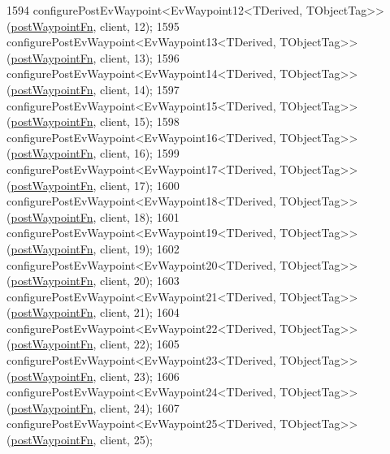 \begin{DoxyCode}
1594     configurePostEvWaypoint<EvWaypoint12<TDerived, TObjectTag>>(\hyperlink{classcl__move__base__z_1_1WaypointEventDispatcher_a964a57fcce5d48ec60243230722d8dd7}{postWaypointFn}, client, 12);
1595     configurePostEvWaypoint<EvWaypoint13<TDerived, TObjectTag>>(\hyperlink{classcl__move__base__z_1_1WaypointEventDispatcher_a964a57fcce5d48ec60243230722d8dd7}{postWaypointFn}, client, 13);
1596     configurePostEvWaypoint<EvWaypoint14<TDerived, TObjectTag>>(\hyperlink{classcl__move__base__z_1_1WaypointEventDispatcher_a964a57fcce5d48ec60243230722d8dd7}{postWaypointFn}, client, 14);
1597     configurePostEvWaypoint<EvWaypoint15<TDerived, TObjectTag>>(\hyperlink{classcl__move__base__z_1_1WaypointEventDispatcher_a964a57fcce5d48ec60243230722d8dd7}{postWaypointFn}, client, 15);
1598     configurePostEvWaypoint<EvWaypoint16<TDerived, TObjectTag>>(\hyperlink{classcl__move__base__z_1_1WaypointEventDispatcher_a964a57fcce5d48ec60243230722d8dd7}{postWaypointFn}, client, 16);
1599     configurePostEvWaypoint<EvWaypoint17<TDerived, TObjectTag>>(\hyperlink{classcl__move__base__z_1_1WaypointEventDispatcher_a964a57fcce5d48ec60243230722d8dd7}{postWaypointFn}, client, 17);
1600     configurePostEvWaypoint<EvWaypoint18<TDerived, TObjectTag>>(\hyperlink{classcl__move__base__z_1_1WaypointEventDispatcher_a964a57fcce5d48ec60243230722d8dd7}{postWaypointFn}, client, 18);
1601     configurePostEvWaypoint<EvWaypoint19<TDerived, TObjectTag>>(\hyperlink{classcl__move__base__z_1_1WaypointEventDispatcher_a964a57fcce5d48ec60243230722d8dd7}{postWaypointFn}, client, 19);
1602     configurePostEvWaypoint<EvWaypoint20<TDerived, TObjectTag>>(\hyperlink{classcl__move__base__z_1_1WaypointEventDispatcher_a964a57fcce5d48ec60243230722d8dd7}{postWaypointFn}, client, 20);
1603     configurePostEvWaypoint<EvWaypoint21<TDerived, TObjectTag>>(\hyperlink{classcl__move__base__z_1_1WaypointEventDispatcher_a964a57fcce5d48ec60243230722d8dd7}{postWaypointFn}, client, 21);
1604     configurePostEvWaypoint<EvWaypoint22<TDerived, TObjectTag>>(\hyperlink{classcl__move__base__z_1_1WaypointEventDispatcher_a964a57fcce5d48ec60243230722d8dd7}{postWaypointFn}, client, 22);
1605     configurePostEvWaypoint<EvWaypoint23<TDerived, TObjectTag>>(\hyperlink{classcl__move__base__z_1_1WaypointEventDispatcher_a964a57fcce5d48ec60243230722d8dd7}{postWaypointFn}, client, 23);
1606     configurePostEvWaypoint<EvWaypoint24<TDerived, TObjectTag>>(\hyperlink{classcl__move__base__z_1_1WaypointEventDispatcher_a964a57fcce5d48ec60243230722d8dd7}{postWaypointFn}, client, 24);
1607     configurePostEvWaypoint<EvWaypoint25<TDerived, TObjectTag>>(\hyperlink{classcl__move__base__z_1_1WaypointEventDispatcher_a964a57fcce5d48ec60243230722d8dd7}{postWaypointFn}, client, 25);

\end{DoxyCode}
